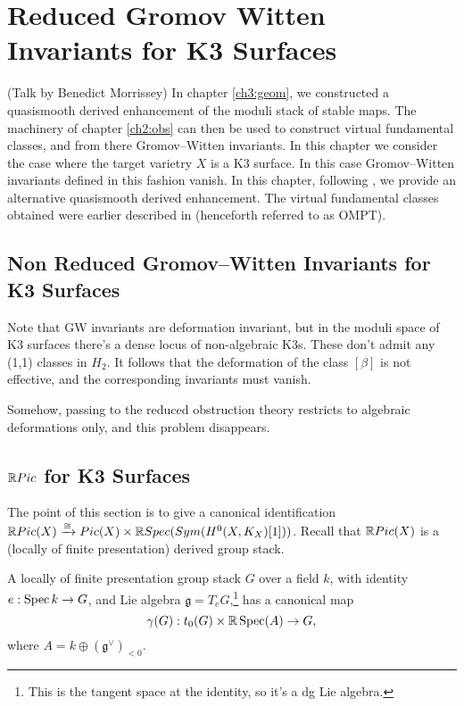 \chapter{Reduced Gromov Witten Invariants for K3 Surfaces}
\label{ch4:k3}

(Talk by Benedict Morrissey)  In chapter \ref{ch3:geom}, we constructed a quasismooth derived enhancement of the moduli stack of stable maps. The machinery of chapter \ref{ch2:obs} can then be used to construct virtual fundamental classes, and from there Gromov--Witten invariants. In this chapter we consider the case where the target varietry $X$ is a K3 surface.  In this case Gromov--Witten invariants defined in this fashion vanish. In this chapter, following \cite{schurg2015derived}, we provide an alternative quasismooth derived enhancement. The virtual fundamental classes obtained were earlier described in \cite{maulik2007gromov, maulik2010curves, okounkov2010quantum} (henceforth referred to as OMPT).

\section{Non Reduced Gromov--Witten Invariants for K3 Surfaces}
Note that GW invariants are deformation invariant, but in the moduli space of K3 surfaces there's a dense locus of non-algebraic
K3s. These don't admit any (1,1) classes in $H_2$. It follows that the deformation of the class $[\beta]$ is not effective,
and the corresponding invariants must vanish.

Somehow, passing to the reduced obstruction theory restricts to algebraic deformations only, and this problem disappears.



\section{$\mathbb R Pic$ for K3 Surfaces}

The point of this section is to give a canonical identification $\mathbb R Pic(X)\xrightarrow{\cong}Pic(X)\times \mathbb R Spec(Sym(H^{0}(X,K_{X})[1]))$.  Recall that $\mathbb R Pic(X)$ is a (locally of finite presentation) derived group stack.

\begin{thm}
\label{thm:derivedgroup}
A locally of finite presentation group stack $G$ over a field $k$, with identity $e: \operatorname{Spec} k\rightarrow G$, and Lie algebra $\mathfrak{g}=T_{e}G$,\footnote{This is the tangent space at the identity, so it's a dg Lie algebra.} has a canonical map
\[\gamma(G):t_{0}(G)\times \mathbb R \operatorname{Spec}(A)\rightarrow G,\]
where $A=k\oplus (\mathfrak{g}^{\vee})_{<0}$.
\end{thm}

